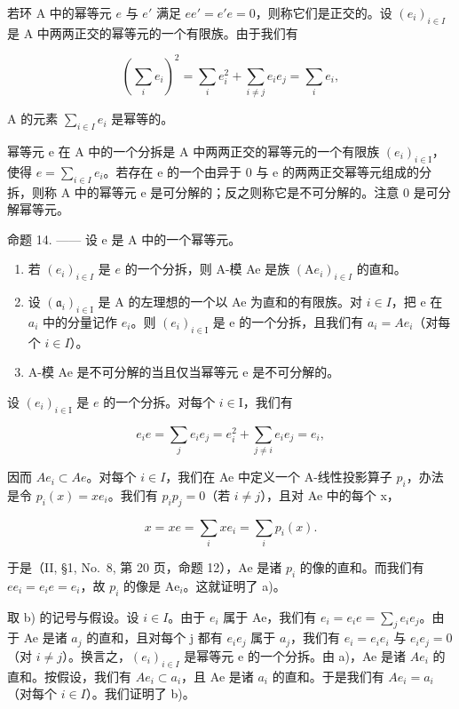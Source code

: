 若环 A 中的幂等元 \(e\) 与 \(e'\) 满足 \(ee' = e'e = 0\)，则称它们是正交的。设 \((e_i)_{i \in I}\) 是 A 中两两正交的幂等元的一个有限族。由于我们有

\[
\left(\sum_ {i} e _ {i}\right) ^ {2} = \sum_ {i} e _ {i} ^ {2} + \sum_ {i \neq j} e _ {i} e _ {j} = \sum_ {i} e _ {i},
\]

A 的元素 \(\sum_{i\in I}e_i\) 是幂等的。

幂等元 e 在 A 中的一个分拆是 A 中两两正交的幂等元的一个有限族 \((e_{i})_{i\in\mathrm{I}}\)，使得 \(e=\sum_{i\in I}e_{i}\)。若存在 e 的一个由异于 0 与 e 的两两正交幂等元组成的分拆，则称 A 中的幂等元 e 是可分解的；反之则称它是不可分解的。注意 0 是可分解幂等元。

命题 14. —— 设 e 是 A 中的一个幂等元。

\begin{enumerate}
\def\labelenumi{\alph{enumi})}
\item
  若 \((e_i)_{i\in I}\) 是 \(e\) 的一个分拆，则 A-模 Ae 是族 \((\mathrm{A}e_i)_{i\in I}\) 的直和。
\item
  设 \((\mathfrak{a}_{i})_{i\in\mathrm{I}}\) 是 A 的左理想的一个以 Ae 为直和的有限族。对 \(i\in I\)，把 e 在 \(a_{i}\) 中的分量记作 \(e_{i}\)。则 \((e_{i})_{i\in\mathrm{I}}\) 是 e 的一个分拆，且我们有 \(a_{i}=Ae_{i}\)（对每个 \(i\in I\)）。
\item
  A-模 Ae 是不可分解的当且仅当幂等元 e 是不可分解的。
\end{enumerate}

设 \((e_i)_{i\in \mathrm{I}}\) 是 \(e\) 的一个分拆。对每个 \(i\in \mathrm{I}\)，我们有

\[
e _ {i} e = \sum_ {j} e _ {i} e _ {j} = e _ {i} ^ {2} + \sum_ {j \neq i} e _ {i} e _ {j} = e _ {i},
\]

因而 \(Ae_{i} \subset Ae\)。对每个 \(i \in I\)，我们在 Ae 中定义一个 A-线性投影算子 \(p_{i}\)，办法是令 \(p_{i}(x) = xe_{i}\)。我们有 \(p_{i}p_{j} = 0\)（若 \(i \neq j\)），且对 Ae 中的每个 x，

\[
x = x e = \sum_ {i} x e _ {i} = \sum_ {i} p _ {i} (x).
\]

于是（II, §1, No.~8, 第 20 页，命题 12），Ae 是诸 \(p_i\) 的像的直和。而我们有 \(ee_i = e_i e = e_i\)，故 \(p_i\) 的像是 \(\mathrm{Ae}_i\)。这就证明了 a)。

取 b) 的记号与假设。设 \(i \in I\)。由于 \(e_{i}\) 属于 Ae，我们有 \(e_{i} = e_{i}e = \sum_{j} e_{i}e_{j}\)。由于 Ae 是诸 \(a_{j}\) 的直和，且对每个 j 都有 \(e_{i}e_{j}\) 属于 \(a_{j}\)，我们有 \(e_{i} = e_{i}e_{i}\) 与 \(e_{i}e_{j} = 0\)（对 \(i \neq j\)）。换言之，\((e_{i})_{i \in I}\) 是幂等元 e 的一个分拆。由 a)，Ae 是诸 \(Ae_{i}\) 的直和。按假设，我们有 \(Ae_{i} \subset a_{i}\)，且 Ae 是诸 \(a_{i}\) 的直和。于是我们有 \(Ae_{i} = a_{i}\)（对每个 \(i \in I\)）。我们证明了 b)。

